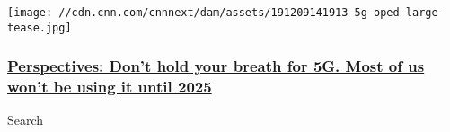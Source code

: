 \begin{itemize}
  \texttt{[image: //cdn.cnn.com/cnnnext/dam/assets/191209141913-5g-oped-large-tease.jpg]}

  \hypertarget{perspectives-dont-hold-your-breath-for-5g-most-of-us-wont-be-using-it-until-2025}{%
  \subsubsection{\texorpdfstring{\href{/2019/12/10/perspectives/5g-technology-t-mobile-att-verizon/index.html}{Perspectives:
  Don't hold your breath for 5G. Most of us won't be using it until
  2025}}{Perspectives: Don't hold your breath for 5G. Most of us won't be using it until 2025}}\label{perspectives-dont-hold-your-breath-for-5g-most-of-us-wont-be-using-it-until-2025}}
\end{itemize}

Search

